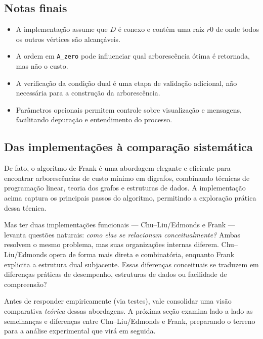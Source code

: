 \subsection{Notas finais}
\begin{itemize}\setlength{\itemsep}{2pt}
	\item A implementação assume que \(D\) é conexo e contém uma raiz \(r0\) de onde todos os outros vértices são alcançáveis.
	\item A ordem em \texttt{A\_zero} pode influenciar qual arborescência ótima é retornada, mas não o custo.
	\item A verificação da condição dual é uma etapa de validação adicional, não necessária para a construção da arborescência.
	\item Parâmetros opcionais permitem controle sobre visualização e mensagens, facilitando depuração e entendimento do processo.
\end{itemize}

\subsection{Das implementações à comparação sistemática}

De fato, o algoritmo de Frank é uma abordagem elegante e eficiente para encontrar arborescências de custo mínimo em digrafos, combinando técnicas de programação linear, teoria dos grafos e estruturas de dados. A implementação acima captura os principais passos do algoritmo, permitindo a exploração prática dessa técnica.


Mas ter duas implementações funcionais — Chu–Liu/Edmonds e Frank — levanta questões naturais: \emph{como elas se relacionam conceitualmente?} Ambas resolvem o mesmo problema, mas suas organizações internas diferem. Chu–Liu/Edmonds opera de forma mais direta e combinatória, enquanto Frank explicita a estrutura dual subjacente. Essas diferenças conceituais se traduzem em diferenças práticas de desempenho, estruturas de dados ou facilidade de compreensão?


Antes de responder empiricamente (via testes), vale consolidar uma visão comparativa \emph{teórica} dessas abordagens. A próxima seção examina lado a lado as semelhanças e diferenças entre Chu–Liu/Edmonds e Frank, preparando o terreno para a análise experimental que virá em seguida.
